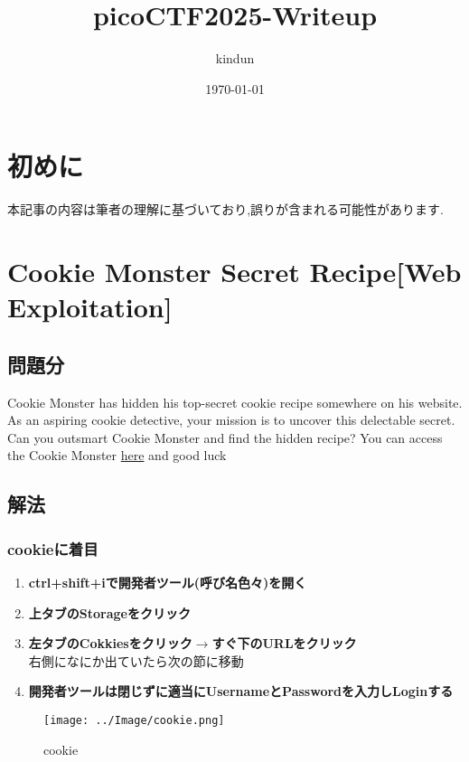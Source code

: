 \documentclass[dvipdfmx]{jsarticle}
\title{picoCTF2025-Writeup}
\author{kindun}
\date{\today}
\begin{document}
\maketitle 

\section{初めに}
本記事の内容は筆者の理解に基づいており,誤りが含まれる可能性があります.

\section{Cookie Monster Secret Recipe[Web Exploitation]}
\subsection{問題分}
Cookie Monster has hidden his top-secret cookie recipe somewhere on his website. As an aspiring cookie detective, your mission is to uncover this delectable secret. Can you outsmart Cookie Monster and find the hidden recipe? You can access the Cookie Monster \href{http://verbal-sleep.picoctf.net:56571/}{here} and good luck

\subsection{解法}
\subsubsection{cookieに着目}
\begin{enumerate}
	\item \textbf{ctrl+shift+iで開発者ツール(呼び名色々)を開く}
	\item \textbf{上タブのStorageをクリック}
	\item \textbf{左タブのCokkiesをクリック$ \xrightarrow{} $すぐ下のURLをクリック}\\
	右側になにか出ていたら次の節に移動
	\item \textbf{開発者ツールは閉じずに適当にUsernameとPasswordを入力しLoginする}
\end{enumerate}

\begin{figure}[h]
\begin{center}
\texttt{[image: ../Image/cookie.png]}
\caption{cookie}
\end{center}
\end{figure}
\end{document}

